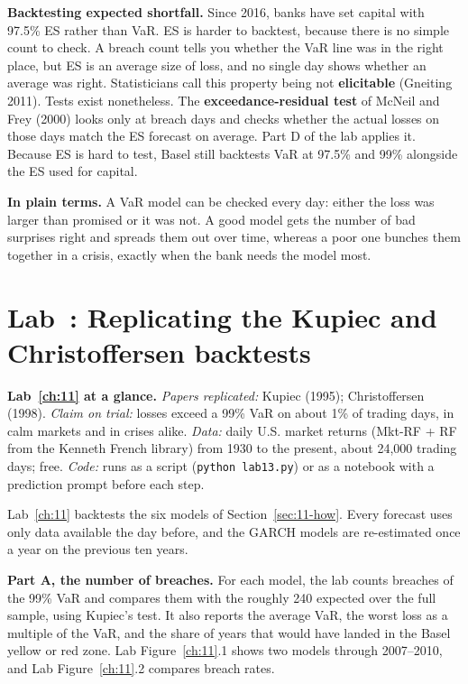 \textbf{Backtesting expected shortfall.} Since 2016, banks have set capital with 97.5\% ES rather than VaR. ES is harder to backtest, because there is no simple count to check. A breach count tells you whether the VaR line was in the right place, but ES is an average size of loss, and no single day shows whether an average was right. Statisticians call this property being not \textbf{elicitable} (Gneiting 2011). Tests exist nonetheless. The \textbf{exceedance-residual test} of McNeil and Frey (2000) looks only at breach days and checks whether the actual losses on those days match the ES forecast on average. Part D of the lab applies it. Because ES is hard to test, Basel still backtests VaR at 97.5\% and 99\% alongside the ES used for capital.

\noindent\textbf{In plain terms.} A VaR model can be checked every day: either the loss was larger than promised or it was not. A good model gets the number of bad surprises right and spreads them out over time, whereas a poor one bunches them together in a crisis, exactly when the bank needs the model most.


\section{Lab~\thechapter: Replicating the Kupiec and Christoffersen backtests}
\label{sec:11-lab}

\begin{callout}
\textbf{Lab~\ref{ch:11} at a glance.} \emph{Papers replicated:} Kupiec (1995); Christoffersen (1998). \emph{Claim on trial:} losses exceed a 99\% VaR on about 1\% of trading days, in calm markets and in crises alike. \emph{Data:} daily U.S. market returns (Mkt-RF + RF from the Kenneth French library) from 1930 to the present, about 24,000 trading days; free. \emph{Code:} runs as a script (\texttt{python lab13.py}) or as a notebook with a prediction prompt before each step.
\end{callout}

Lab~\ref{ch:11} backtests the six models of Section~\ref{sec:11-how}. Every forecast uses only data available the day before, and the GARCH models are re-estimated once a year on the previous ten years.

\textbf{Part A, the number of breaches.} For each model, the lab counts breaches of the 99\% VaR and compares them with the roughly 240 expected over the full sample, using Kupiec's test. It also reports the average VaR, the worst loss as a multiple of the VaR, and the share of years that would have landed in the Basel yellow or red zone. Lab Figure~\ref{ch:11}.1 shows two models through 2007--2010, and Lab Figure~\ref{ch:11}.2 compares breach rates.


